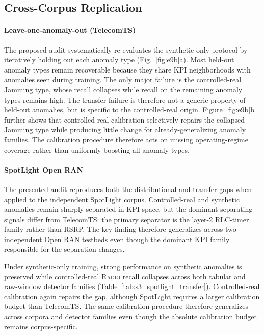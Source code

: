 \documentclass[sigconf,review]{acmart}
\begin{document}
\subsection{Cross-Corpus Replication}
\label{sec:cross-corpus}

\paragraph{Leave-one-anomaly-out (TelecomTS)}
The proposed audit systematically re-evaluates the synthetic-only protocol by iteratively holding out each anomaly type (Fig.~\ref{fig:e9b}a). Most held-out anomaly types remain recoverable because they share KPI neighborhoods with anomalies seen during training. The only major failure is the controlled-real Jamming type, whose recall collapses while recall on the remaining anomaly types remains high. The transfer failure is therefore not a generic property of held-out anomalies, but is specific to the controlled-real origin. Figure~\ref{fig:e9b}b further shows that controlled-real calibration selectively repairs the collapsed Jamming type while producing little change for already-generalizing anomaly families. The calibration procedure therefore acts on missing operating-regime coverage rather than uniformly boosting all anomaly types.

\paragraph{SpotLight Open RAN}
The presented audit reproduces both the distributional and transfer gaps when applied to the independent SpotLight corpus. Controlled-real and synthetic anomalies remain sharply separated in KPI space, but the dominant separating signals differ from TelecomTS: the primary separator is the layer-2 RLC-timer family rather than RSRP. The key finding therefore generalizes across two independent Open RAN testbeds even though the dominant KPI family responsible for the separation changes.

Under synthetic-only training, strong performance on synthetic anomalies is preserved while controlled-real \textsc{Radio} recall collapses across both tabular and raw-window detector families (Table~\ref{tab:s3_spotlight_transfer}). Controlled-real calibration again repairs the gap, although SpotLight requires a larger calibration budget than TelecomTS. The same calibration procedure therefore generalizes across corpora and detector families even though the absolute calibration budget remains corpus-specific.
\end{document}
